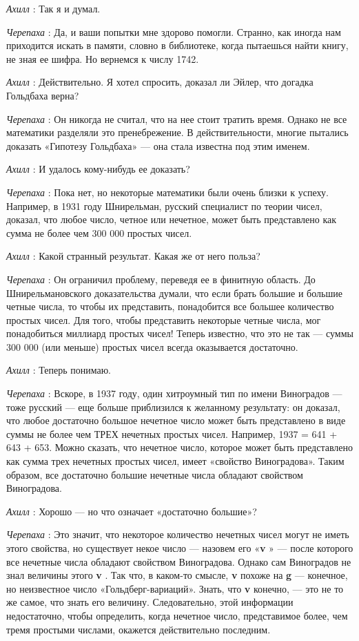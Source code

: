 \emph{Ахилл} : Так я и думал.

\emph{Черепаха} : Да, и ваши попытки мне здорово помогли. Странно, как иногда нам приходится искать в памяти, словно в библиотеке, когда пытаешься найти книгу, не зная ее шифра. Но вернемся к числу 1742.

\emph{Ахилл} : Действительно. Я хотел спросить, доказал ли Эйлер, что догадка Гольдбаха верна?

\emph{Черепаха} : Он никогда не считал, что на нее стоит тратить время. Однако не все математики разделяли это пренебрежение. В действительности, многие пытались доказать «Гипотезу Гольдбаха» --- она стала известна под этим именем.

\emph{Ахилл} : И удалось кому-нибудь ее доказать?

\emph{Черепаха} : Пока нет, но некоторые математики были очень близки к успеху. Например, в 1931 году Шнирельман, русский специалист по теории чисел, доказал, что любое число, четное или нечетное, может быть представлено как сумма не более чем 300 000 простых чисел.

\emph{Ахилл} : Какой странный результат. Какая же от него польза?

\emph{Черепаха} : Он ограничил проблему, переведя ее в финитную область. До Шнирельмановского доказательства думали, что если брать большие и большие четные числа, то чтобы их представить, понадобится все большее количество простых чисел. Для того, чтобы представить некоторые четные числа, мог понадобиться миллиард простых чисел! Теперь известно, что это не так --- суммы 300 000 (или меньше) простых чисел всегда оказывается достаточно.

\emph{Ахилл} : Теперь понимаю.

\emph{Черепаха} : Вскоре, в 1937 году, один хитроумный тип по имени Виноградов --- тоже русский --- еще больше приблизился к желанному результату: он доказал, что любое достаточно большое нечетное число может быть представлено в виде суммы не более чем ТРЕХ нечетных простых чисел. Например, 1937 = 641 + 643 + 653. Можно сказать, что нечетное число, которое может быть представлено как сумма трех нечетных простых чисел, имеет «свойство Виноградова». Таким образом, все достаточно большие нечетные числа обладают свойством Виноградова.

\emph{Ахилл} : Хорошо --- но что означает «достаточно большие»?

\emph{Черепаха} : Это значит, что некоторое количество нечетных чисел могут не иметь этого свойства, но существует некое число --- назовем его «\textbf{v} » --- после которого все нечетные числа обладают свойством Виноградова. Однако сам Виноградов не знал величины этого \textbf{v} . Так что, в каком-то смысле, \textbf{v} похоже на \textbf{g} --- конечное, но неизвестное число «Гольдберг-вариаций». Знать, что \textbf{v} конечно, --- это не то же самое, что знать его величину. Следовательно, этой информации недостаточно, чтобы определить, когда нечетное число, представимое более, чем тремя простыми числами, окажется действительно последним.


